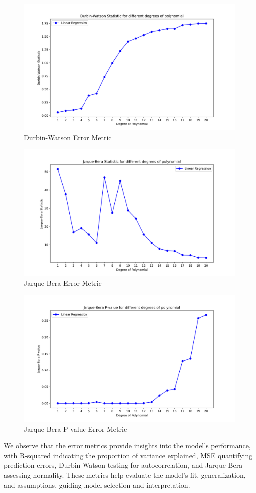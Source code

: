 \begin{figure}[H]
    \centering
    \includegraphics[width=0.5\linewidth]{./Images/Durbin-Watson.png}
    \caption{Durbin-Watson Error Metric}
\end{figure}

\begin{figure}[H]
    \centering
    \includegraphics[width=0.5\linewidth]{./Images/Jarque-Bera.png}
    \caption{Jarque-Bera Error Metric}
\end{figure}

\begin{figure}[H]
    \centering
    \includegraphics[width=0.5\linewidth]{./Images/JB-P-value.png}
    \caption{Jarque-Bera P-value Error Metric}
\end{figure}

We observe that the error metrics provide insights into the model's performance, with R-squared indicating the proportion of variance explained, MSE quantifying prediction errors, Durbin-Watson testing for autocorrelation, and Jarque-Bera assessing normality. These metrics help evaluate the model's fit, generalization, and assumptions, guiding model selection and interpretation.

